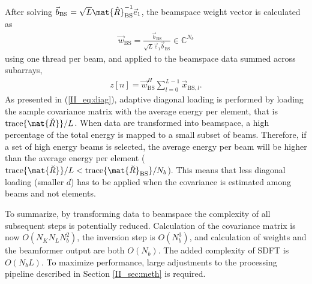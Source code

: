 After solving $\vec{b}_\text{BS} = \sqrt{L}\mat{\hat{R}}_\text{BS}^{-1}\vec{e}_1$, the beamspace weight vector is calculated as
%
\begin{align}
\vec{w}_\text{BS} = \frac{\vec{b}_\text{BS}}{\sqrt{L}\vec{e}_1\vec{b}_\text{BS}} \in \mathbb{C}^{N_b}
\end{align}  
%
using one thread per beam, and applied to the beamspace data summed across subarrays,
%
\begin{align}
z[n] = \vec{w}_\text{BS}^H\sum_{l=0}^{L-1}\vec{x}_{\text{BS},l}. 
\end{align}
%
%
As presented in (\ref{II_eq:diag}), adaptive diagonal loading is performed by loading the sample covariance matrix with the average energy per element, that is $\text{trace}\{\mat{\breve{R}}\}/L$. When data are transformed into beamspace, a high percentage of the total energy is mapped to a small subset of beams. Therefore, if a set of high energy beams is selected, the average energy per beam will be higher than the average energy per element ($\text{trace}\{\mat{\breve{R}}\}/L < \text{trace}\{\mat{\breve{R}}_{\text{BS}}\}/N_b$). This means that less diagonal loading (smaller $d$) has to be applied when the covariance is estimated among beams and not elements. 

To summarize, by transforming data to beamspace the complexity of all subsequent steps is potentially reduced. Calculation of the covariance matrix is now $O(N_KN_LN_b^2)$, the inversion step is $O(N_b^3)$, and calculation of weights and the beamformer output are both $O(N_b)$. The added complexity of SDFT is $O(N_bL)$. To maximize performance, large adjustments to the processing pipeline described in Section \ref{II_sec:meth} is required. 




